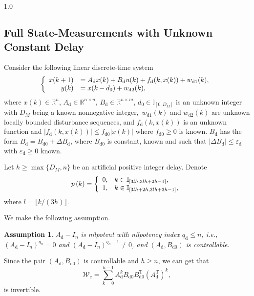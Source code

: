 \documentclass[journal]{IEEEtran}
\newtheorem{assumption}{Assumption}
\begin{document}
\begin{spacing}{1.0}
\subsection{Full State-Measurements with Unknown Constant Delay}

Consider the following linear discrete-time system
\begin{equation}
\left\{
\begin{array}
[c]{rl}%
x(k+1) & =A_{\mathrm{d}}x(k)+B_{\mathrm{d}}u(k)+f_{\mathrm{d}}%
(k,x(k))+w_{\mathrm{d}1}(k),\\
y(k) & =x(k-d_{0})+w_{\mathrm{d}2}(k),
\end{array}
\right.  \label{dis_sys_2}%
\end{equation}
where $x(k)\in\mathbb{R}^{n}$, $A_{\mathrm{d}}\in\mathbb{R}^{n\times n}$,
$B_{\mathrm{d}}\in\mathbb{R}^{n\times m}$, $d_{0}\in\mathbb{I}_{[0,D_{M}]}$ is
an unknown integer with $D_{M}$ being a known nonnegative integer,\ $w_{\mathrm{d}1}(k)$
and $w_{\mathrm{d}2}(k)$ are unknown locally bounded disturbance sequences, and $f_{\mathrm{d}}(k,x(k))$ is an unknown function and
$|f_{\mathrm{d}}(k,x(k))|\leq f_{\mathrm{d}0}|x(k)|$ where $f_{\mathrm{d}0}\geq0$
is known. $B_{\mathrm{d}}$ has the form $B_{\mathrm{d}}=B_{\mathrm{d}%
0}+\mathit{\Delta}B_{\mathrm{d}}$, where $B_{\mathrm{d}0}$ is constant, known
and such that $|\mathit{\Delta}B_{\mathrm{d}}|\leq\varepsilon_{\mathrm{d}}$
with $\varepsilon_{\mathrm{d}}\geq0$ known.

Let $h\geq\max\{D_{M},n\}$ be an artificial positive integer delay. Denote
\[
p\left(  k\right)  =\left\{
\begin{array}
[c]{cl}%
0, & k\in\mathbb{I}_{[3lh,3lh+2h-1]},\\
1, & k\in\mathbb{I}_{[3lh+2h,3lh+3h-1]},
\end{array}
\right.
\]
where $l=\lfloor k/(3h)\rfloor$.

We make the following assumption.

\begin{assumption}
\label{assu_3}$A_{\mathrm{d}}-I_{n}$ is nilpotent with nilpotency index $q_{\mathrm{d}}\leq n$, i.e., $(A_{\mathrm{d}}%
-I_{n})^{q_{\mathrm{d}}}=0$ and $(A_{\mathrm{d}}-I_{n})^{q_{\mathrm{d}}-1}\neq0$, and $(A_{\mathrm{d}},B_{\mathrm{d}0})$ is controllable.
\end{assumption}

Since the pair $(A_{\mathrm{d}},B_{\mathrm{d}0})$ is controllable and $h\geq
n$, we can get that%
\[
\mathcal{W}_{\mathrm{c}}=%
{\displaystyle\sum_{k=0}^{h-1}}
A_{\mathrm{d}}^{k}B_{\mathrm{d}0}B_{\mathrm{d}0}^{\mathrm{T}}\left(
A_{\mathrm{d}}^{\mathrm{T}}\right)  ^{k},
\]
is invertible.


\end{spacing}
\end{document}
